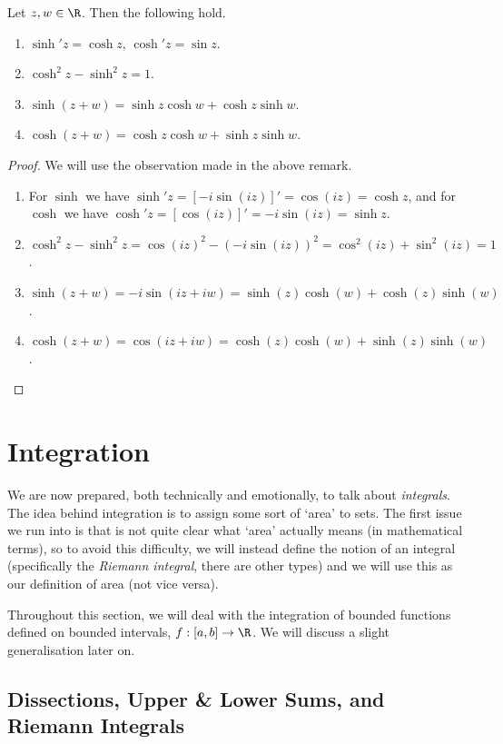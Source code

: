 \begin{proposition}
	Let $z, w \in \R$. Then the following hold.
	\begin{enumerate}[label=(\roman*)]
		\item $\sinh' z = \cosh z$, $\cosh' z = \sin z$.
		\item $\cosh^2 z - \sinh^2 z = 1$.
		\item $\sinh (z+w)=\sinh z \cosh w+\cosh z \sinh w$.
		\item $\cosh (z+w)=\cosh z \cosh w+\sinh z \sinh w$.
	\end{enumerate}
\end{proposition}
\begin{proof}
We will use the observation made in the above remark.
\begin{enumerate}[label=(\roman*)]
	\item For $\sinh$ we have $\sinh'z = [-i\sin(iz)]' = \cos(iz) = \cosh z$, and for $\cosh$ we have $\cosh'z = [\cos(iz)]' = -i\sin(iz) = \sinh z$.
	\item $\cosh^2 z - \sinh^2 z = \cos(iz)^2 - (-i\sin(iz))^2 = \cos^2(iz) + \sin^2(iz) = 1$.
	\item $\sinh(z + w) = -i\sin(iz + iw)= \sinh(z)\cosh(w) + \cosh(z)\sinh(w)$.
	\item $\cosh(z + w) = \cos(iz + iw)= \cosh(z)\cosh(w) + \sinh(z)\sinh(w)$.\qedhere
\end{enumerate}
\end{proof}

\clearpage
\section{Integration}

We are now prepared, both technically and emotionally, to talk about \emph{integrals}. 
The idea behind integration is to assign some sort of `area' to sets. The first issue we run into is that is not quite clear what `area' actually means (in mathematical terms), so to avoid this difficulty, we will instead define the notion of an integral (specifically the \emph{Riemann integral}, there are other types) and we will use this as our definition of area (not vice versa). 

Throughout this section, we will deal with the integration of bounded functions defined on bounded intervals, $f: [a, b] \rightarrow \R$. We will discuss a slight generalisation later on.

\subsection{Dissections, Upper \& Lower Sums, and Riemann Integrals}


